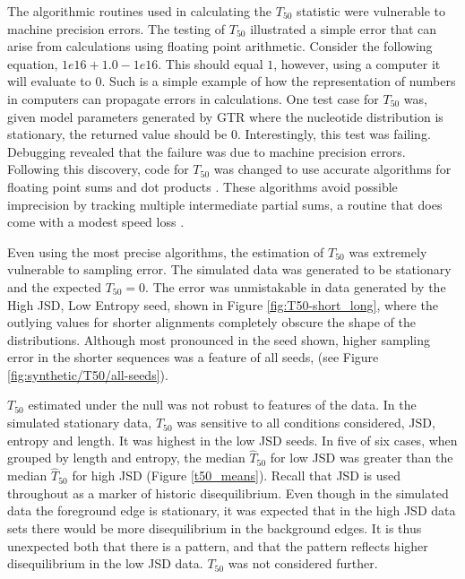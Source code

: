 The algorithmic routines used in calculating the $T_{50}$ statistic were vulnerable to machine precision errors. The testing of $T_{50}$ illustrated a simple error that can arise from calculations using \gls{floating point arithmetic}. Consider the following equation, $1e16 + 1.0 - 1e16$. This should equal $1$, however, using a computer it will evaluate to $0$. Such is a simple example of how the representation of numbers in computers can propagate errors in calculations. One test case for $T_{50}$ was, given model parameters generated by GTR where the nucleotide distribution is stationary, the returned value should be $0$. Interestingly, this test was failing. Debugging revealed that the failure was due to machine precision errors. Following this discovery, code for $T_{50}$ was changed to use accurate algorithms for floating point sums and dot products \citep{accupy}. These algorithms avoid possible imprecision by tracking multiple intermediate partial sums, a routine that does come with a modest speed loss \citep{Shewchuk1997AdaptivePredicates, Ogita2005AccurateProduct}. 

Even using the most precise algorithms, the estimation of $T_{50}$ was extremely vulnerable to sampling error. The simulated data was generated to be stationary and the expected $T_{50} = 0$. The error was unmistakable in data generated by the High JSD, Low Entropy seed, shown in Figure \ref{fig:T50-short_long}, where the outlying values for shorter alignments completely obscure the shape of the distributions. Although most pronounced in the seed shown, higher sampling error in the shorter sequences was a feature of all seeds, (see Figure \ref{fig:synthetic/T50/all-seeds}). 



$T_{50}$ estimated under the null was not robust to features of the data. In the simulated stationary data, $T_{50}$ was sensitive to all conditions considered, JSD, entropy and length. It was highest in the low JSD seeds. In five of six cases, when grouped by length and entropy, the median $\hat T_{50}$ for low JSD was greater than the median $\hat T_{50}$ for high JSD (Figure \ref{t50_means}). Recall that JSD is used throughout as a marker of historic disequilibrium. Even though in the simulated data the foreground edge is stationary, it was expected that in the high JSD data sets there would be more disequilibrium in the background edges. It is thus unexpected both that there is a pattern, and that the pattern reflects higher disequilibrium in the low JSD data. $T_{50}$ was not considered further. 

